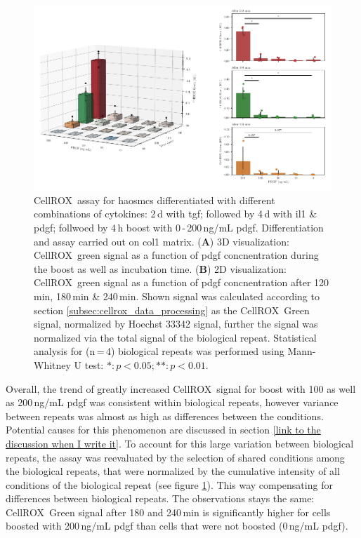     \begin{figure}[h!]
    \capstart
        \centering
    	\includegraphics{Abbildung/CellROX_titration_norm.pdf}
    	\begin{minipage}{\captionwidth}
    		\caption[cellROX_titration_norm]{ \newline
            CellROX\texttrademark~assay for \acp{haosmc} differentiated with different combinations of cytokines: 2\,d with \ac{tgf}; followed by 4\,d with \ac{il1} \& \ac{pdgf}; follwoed by 4\,h boost with 0\,-\,200\,ng/mL \ac{pdgf}. Differentiation and assay carried out on \ac{col1} matrix.
            (\textbf{A}) 3D visualization: CellROX\texttrademark~green signal as a function of \ac{pdgf} concnentration during the boost as well as incubation time.
            (\textbf{B}) 2D visualization: CellROX\texttrademark~green signal as a function of \ac{pdgf} concnentration after 120\,min, 180\,min \& 240\,min.
            Shown signal was calculated according to section \ref{subsec:cellrox_data_processing} as the CellROX\texttrademark~Green signal, normalized by Hoechst 33342 signal, further the signal was normalized via the total signal of the biological repeat. Statistical analysis for (n\,=\,4) biological repeats was performed using Mann-Whitney U test: $*: p < 0.05; **: p < 0.01$.}
    		\label{fig:cellROX_titration_norm}
    	\end{minipage}
    \end{figure}

    Overall, the trend of greatly increased CellROX\texttrademark~signal for boost with 100 as well as 200\,ng/mL \ac{pdgf} was consistent within biological repeats, however variance between repeats was almost as high as differences between the conditions. Potential causes for this phenomenon are discussed in section \ref{link to the discussion when I write it}. To account for this large variation between biological repeats, the assay was reevaluated by the selection of shared conditions among the biological repeats, that were normalized by the cumulative intensity of all conditions of the biological repeat (see figure \ref{fig:cellROX_titration_norm}). This way compensating for differences between biological repeats. The observations stays the same: CellROX\texttrademark~Green signal after 180 and 240\,min is significantly higher for cells boosted with 200\,ng/mL \ac{pdgf} than cells that were not boosted (0\,ng/mL \ac{pdgf}).

